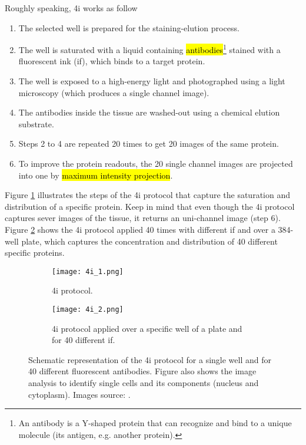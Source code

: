 Roughly speaking, \gls{4i} works as follow
\begin{enumerate}
  \item The selected well is prepared for the staining-elution process.
  \item The well is saturated with a liquid containing \hl{antibodies}\footnote{An antibody is a Y-shaped protein that can recognize and bind to a unique molecule (its antigen, e.g. another protein).} stained with a fluorescent ink (\gls{if}), which binds to a target protein.
  \item The well is exposed to a high-energy light and photographed using a light microscopy (which produces a single channel image).
  \item The antibodies inside the tissue are washed-out using a chemical elution substrate.
  \item Steps 2 to 4 are repeated 20 times to get 20 images of the same protein.
  \item To improve the protein readouts, the 20 single channel images are projected into one by \hl{maximum intensity projection}.
\end{enumerate}

Figure \ref{fig:4i:1} illustrates the steps of the \gls{4i} protocol that capture the saturation and distribution of a specific protein. Keep in mind that even though the \gls{4i} protocol captures sever images of the tissue, it returns an uni-channel image (step 6). Figure \ref{fig:4i:2} shows the \gls{4i} protocol applied 40 times with different \gls{if} and over a 384-well plate, which captures the concentration and distribution of 40 different specific proteins.

\begin{figure}[htb]
  \centering
  \begin{subfigure}[t]{.3\linewidth}
    \texttt{[image: 4i\_1.png]}
    \caption{\Acrfull{4i} protocol.}
    \label{fig:4i:1}
  \end{subfigure}
  \hspace{4mm}
  \begin{subfigure}[t]{.45\linewidth}
    \texttt{[image: 4i\_2.png]}
    \caption{\gls{4i} protocol applied over a specific well of a plate and for 40 different \gls{if}.}
    \label{fig:4i:2}
  \end{subfigure}%
  \caption{Schematic representation of the \gls{4i} protocol for a single well and for 40 different fluorescent antibodies. Figure  also shows the image analysis to identify single cells and its components (nucleus and cytoplasm). Images source: \cite{Guteaar7042}.}
  \label{fig:4i}
\end{figure}

